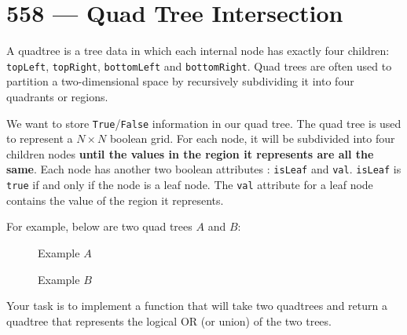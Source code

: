 \section{558 --- Quad Tree Intersection}
A quadtree is a tree data in which each internal node has exactly four children: \texttt{topLeft}, \texttt{topRight}, \texttt{bottomLeft} and \texttt{bottomRight}. Quad trees are often used to partition a two-dimensional space by recursively subdividing it into four quadrants or regions.

We want to store \texttt{True}/\texttt{False} information in our quad tree. The quad tree is used to represent a $N \times N$ boolean grid. For each node, it will be subdivided into four children nodes\textbf{ until the values in the region it represents are all the same}. Each node has another two boolean attributes : \texttt{isLeaf} and \texttt{val}. \texttt{isLeaf} is \texttt{true} if and only if the node is a leaf node. The \texttt{val} attribute for a leaf node contains the value of the region it represents.

For example, below are two quad trees $A$ and $B$:


\begin{figure}[H]
\caption{Example $A$}
\centering
{}
\end{figure}

\begin{figure}[H]
\caption{Example $B$}
\centering
{}
\end{figure}

Your task is to implement a function that will take two quadtrees and return a quadtree that represents the logical OR (or union) of the two trees.

